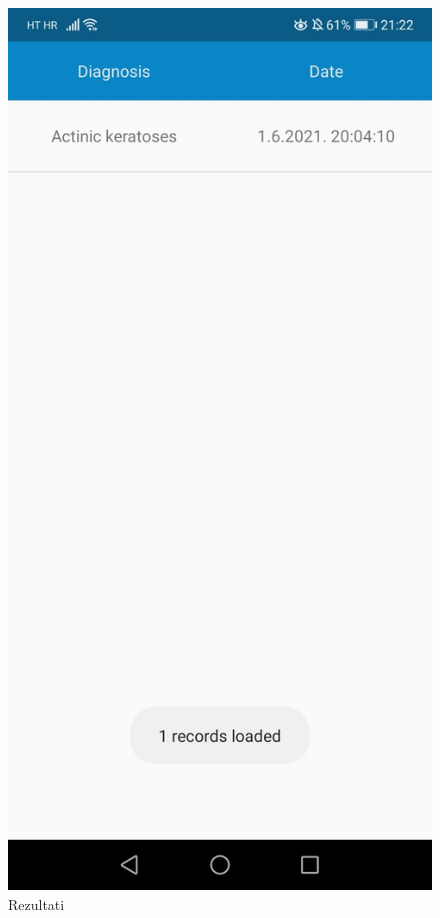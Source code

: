 \documentclass[times, utf8, zavrsni]{fer}
\begin{document}
\begin{figure}[!h]
  \includegraphics[width=1\textwidth]{./slike/app10}
	\caption{Rezultati}
\label{fig:app10}
\endminipage\hfill
\end{figure}
%
\newpage
\end{document}
